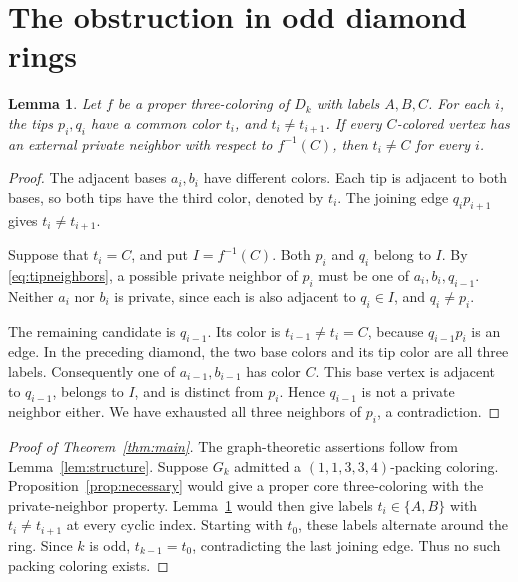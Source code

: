 \documentclass[11pt,a4paper]{article}
\newtheorem{lemma}[theorem]{Lemma}
\theoremstyle{definition}
\theoremstyle{remark}
\newcommand{\palette}{(1,1,3,3,4)}
\begin{document}
\section{The obstruction in odd diamond rings}

\begin{lemma}\label{lem:diamond}
Let \(f\) be a proper three-coloring of \(D_k\) with labels \(A,B,C\).
For each \(i\), the tips \(p_i,q_i\) have a common color \(t_i\),
and \(t_i\ne t_{i+1}\). If every \(C\)-colored vertex has an external
private neighbor with respect to \(f^{-1}(C)\), then \(t_i\ne C\)
for every \(i\).
\end{lemma}

\begin{proof}
The adjacent bases \(a_i,b_i\) have different colors. Each tip is
adjacent to both bases, so both tips have the third color, denoted
by \(t_i\). The joining edge \(q_ip_{i+1}\) gives
\(t_i\ne t_{i+1}\).

Suppose that \(t_i=C\), and put \(I=f^{-1}(C)\). Both \(p_i\)
and \(q_i\) belong to \(I\). By \eqref{eq:tipneighbors}, a possible
private neighbor of \(p_i\) must be one of
\(a_i,b_i,q_{i-1}\). Neither \(a_i\) nor \(b_i\) is private, since
each is also adjacent to \(q_i\in I\), and \(q_i\ne p_i\).

The remaining candidate is \(q_{i-1}\). Its color is
\(t_{i-1}\ne t_i=C\), because \(q_{i-1}p_i\) is an edge.
In the preceding diamond, the two base colors and its tip color are
all three labels. Consequently one of \(a_{i-1},b_{i-1}\) has color
\(C\). This base vertex is adjacent to \(q_{i-1}\), belongs to
\(I\), and is distinct from \(p_i\). Hence \(q_{i-1}\) is not a
private neighbor either. We have exhausted all three neighbors of
\(p_i\), a contradiction.
\end{proof}

\begin{proof}[Proof of Theorem~\ref{thm:main}]
The graph-theoretic assertions follow from Lemma~\ref{lem:structure}.
Suppose \(G_k\) admitted a \(\palette\)-packing coloring.
Proposition~\ref{prop:necessary} would give a proper core
three-coloring with the private-neighbor property.
Lemma~\ref{lem:diamond} would then give labels \(t_i\in\{A,B\}\)
with \(t_i\ne t_{i+1}\) at every cyclic index. Starting with \(t_0\),
these labels alternate around the ring. Since \(k\) is odd,
\(t_{k-1}=t_0\), contradicting the last joining edge.
Thus no such packing coloring exists.
\end{proof}
\end{document}
